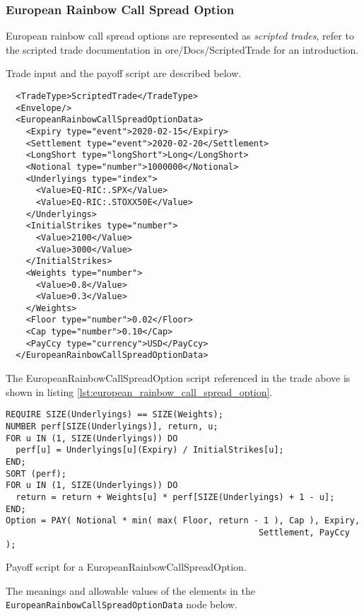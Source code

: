 \subsubsection*{European Rainbow Call Spread Option}

European rainbow call spread options are represented as {\em scripted trades}, refer to the scripted trade documentation in ore/Docs/ScriptedTrade
for an introduction.

Trade input and the payoff script are described below.

\begin{verbatim}
  <TradeType>ScriptedTrade</TradeType>
  <Envelope/>
  <EuropeanRainbowCallSpreadOptionData>
    <Expiry type="event">2020-02-15</Expiry>
    <Settlement type="event">2020-02-20</Settlement>
    <LongShort type="longShort">Long</LongShort>
    <Notional type="number">1000000</Notional>
    <Underlyings type="index">
      <Value>EQ-RIC:.SPX</Value>
      <Value>EQ-RIC:.STOXX50E</Value>
    </Underlyings>
    <InitialStrikes type="number">
      <Value>2100</Value>
      <Value>3000</Value>
    </InitialStrikes>
    <Weights type="number">
      <Value>0.8</Value>
      <Value>0.3</Value>
    </Weights>
    <Floor type="number">0.02</Floor>
    <Cap type="number">0.10</Cap>
    <PayCcy type="currency">USD</PayCcy>
  </EuropeanRainbowCallSpreadOptionData>
\end{verbatim}

The EuropeanRainbowCallSpreadOption script referenced in the trade above is shown in listing
\ref{lst:european_rainbow_call_spread_option}.

\begin{listing}[hbt]
\begin{verbatim}
REQUIRE SIZE(Underlyings) == SIZE(Weights);
NUMBER perf[SIZE(Underlyings)], return, u;
FOR u IN (1, SIZE(Underlyings)) DO
  perf[u] = Underlyings[u](Expiry) / InitialStrikes[u];
END;
SORT (perf);
FOR u IN (1, SIZE(Underlyings)) DO
  return = return + Weights[u] * perf[SIZE(Underlyings) + 1 - u];
END;
Option = PAY( Notional * min( max( Floor, return - 1 ), Cap ), Expiry,
                                                  Settlement, PayCcy );
\end{verbatim}
\caption{Payoff script for a EuropeanRainbowCallSpreadOption.}
\label{lst:european_rainbow_call_spread_option}
\end{listing}

The meanings and allowable values of the elements in the \lstinline!EuropeanRainbowCallSpreadOptionData! node below.

